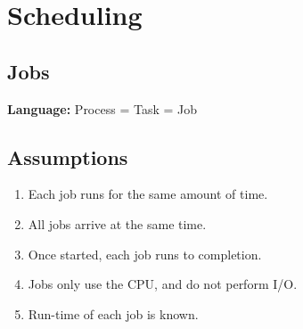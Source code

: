 \chapter{Scheduling}
\label{ch:scheduling}



\section{Jobs}

\textbf{Language:} Process = Task = Job

\section{Assumptions}
\label{sec:scheduling-assumptions}


\begin{enumerate}
\item Each job runs for the same amount of time. \label{item:scheduling-assumption:equal-time}
\item All jobs arrive at the same time. \label{item:scheduling-assumption:same-arrival-time}
\item Once started, each job runs to completion. \label{item:scheduling-assumption:run-to-completion}
\item Jobs only use the CPU, and do not perform I/O. \label{item:scheduling-assumption:cpu-only}
\item Run-time of each job is known. \label{item:scheduling-assumption:run-time-known}
\end{enumerate}

